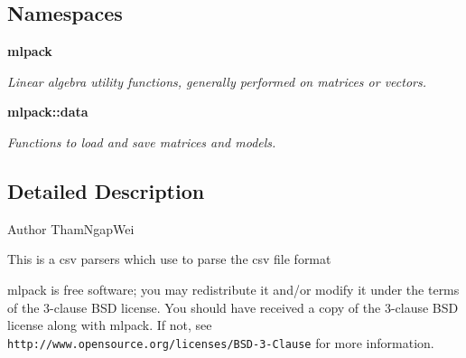 \subsection*{Namespaces}
\begin{DoxyCompactItemize}
\item 
 {\bf mlpack}
\begin{DoxyCompactList}\small\item\em Linear algebra utility functions, generally performed on matrices or vectors. \end{DoxyCompactList}\item 
 {\bf mlpack\+::data}
\begin{DoxyCompactList}\small\item\em Functions to load and save matrices and models. \end{DoxyCompactList}\end{DoxyCompactItemize}


\subsection{Detailed Description}
\begin{DoxyAuthor}{Author}
Tham\+Ngap\+Wei
\end{DoxyAuthor}
This is a csv parsers which use to parse the csv file format

mlpack is free software; you may redistribute it and/or modify it under the terms of the 3-\/clause B\+SD license. You should have received a copy of the 3-\/clause B\+SD license along with mlpack. If not, see {\tt http\+://www.\+opensource.\+org/licenses/\+B\+S\+D-\/3-\/\+Clause} for more information. 